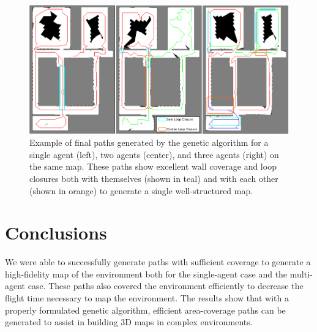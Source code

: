 \documentclass[letterpaper, 10 pt, conference]{ieeeconf}  %
\begin{document}
\begin{figure}
\centering
\includegraphics[width=1.0\linewidth]{paths.png}
\caption[Example of final paths generated by the genetic algorithm.]{Example of final paths generated by the genetic algorithm for a single agent (left), two agents (center), and three agents (right) on the same map. These paths show excellent wall coverage and loop closures both with themselves (shown in teal) and with each other (shown in orange) to generate a single well-structured map.}
\label{fig:final_paths}
\end{figure}

\section{Conclusions}\label{conclusions}

We were able to successfully generate paths with sufficient coverage to generate a high-fidelity map of the environment both for the single-agent case and the multi-agent case. These paths also covered the environment efficiently to decrease the flight time necessary to map the environment. The results show that with a properly formulated genetic algorithm, efficient area-coverage paths can be generated to assist in building 3D maps in complex environments.




\end{document}
